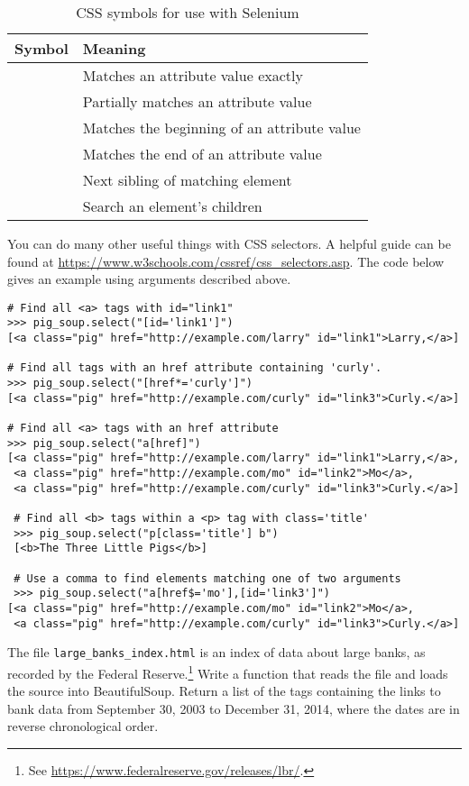 \begin{table}[H]
\centering
\begin{tabular}{c|l}
    Symbol & Meaning \\ \hline
    \li{=} & Matches an attribute value exactly \\
    \li{*=} & Partially matches an attribute value \\
    \li{\^=} & Matches the beginning of an attribute value \\
    \li{\$=} & Matches the end of an attribute value \\
    \li{+} & Next sibling of matching element \\
    \li{>} & Search an element's children \\
\end{tabular}
\caption{CSS symbols for use with Selenium}
\label{table:selenium-css-selectors} %
\end{table}

You can do many other useful things with CSS selectors.
A helpful guide can be found at \url{https://www.w3schools.com/cssref/css_selectors.asp}.
The code below gives an example using arguments described above.

\begin{lstlisting}
# Find all <a> tags with id="link1"
>>> pig_soup.select("[id='link1']")
[<a class="pig" href="http://example.com/larry" id="link1">Larry,</a>]

# Find all tags with an href attribute containing 'curly'.
>>> pig_soup.select("[href*='curly']")
[<a class="pig" href="http://example.com/curly" id="link3">Curly.</a>]

# Find all <a> tags with an href attribute
>>> pig_soup.select("a[href]")
[<a class="pig" href="http://example.com/larry" id="link1">Larry,</a>,
 <a class="pig" href="http://example.com/mo" id="link2">Mo</a>,
 <a class="pig" href="http://example.com/curly" id="link3">Curly.</a>]
 
 # Find all <b> tags within a <p> tag with class='title'
 >>> pig_soup.select("p[class='title'] b")
 [<b>The Three Little Pigs</b>]
 
 # Use a comma to find elements matching one of two arguments
 >>> pig_soup.select("a[href$='mo'],[id='link3']")
[<a class="pig" href="http://example.com/mo" id="link2">Mo</a>,
 <a class="pig" href="http://example.com/curly" id="link3">Curly.</a>]
\end{lstlisting}

\begin{problem} %
The file \texttt{large\_banks\_index.html} is an index of data about large banks, as recorded by the Federal Reserve.\footnote{See \url{https://www.federalreserve.gov/releases/lbr/}.}
Write a function that reads the file and loads the source into BeautifulSoup.
Return a list of the tags containing the links to bank data from September 30, 2003 to December 31, 2014, where the dates are in reverse chronological order. 
\label{prob:bs-bank-index}
\end{problem}
